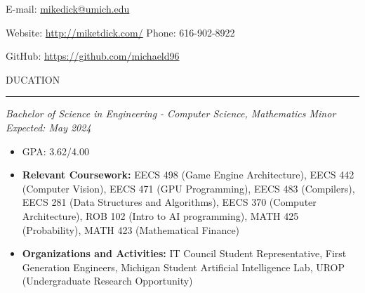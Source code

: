 \documentclass[11pt]{article}
\begin{document}
 \hfill E-mail: {\color{black}\url{ mikedick@umich.edu}}
\par Website: \url{http://miketdick.com/} \hfill Phone: 616-902-8922
\par GitHub: \url{https://github.com/michaeld96}
\newline
\par \scalebox{1.3}{E}DUCATION                    
\par \vspace{-0.1in} \noindent\rule{7.8in}{0.5pt} 
\textbf{\scalebox{1.2}{University of Michigan - Ann Arbor}}
\par \textit{Bachelor of Science in Engineering - Computer Science, Mathematics Minor} \hfill \textit{Expected: May 2024}
{\small 

\begin{itemize}
    \item GPA: 3.62/4.00
    \item \textbf{Relevant Coursework:} EECS 498 (Game Engine Architecture), EECS 442 (Computer Vision), EECS 471 (GPU Programming), EECS 483 (Compilers), EECS 281 (Data Structures and Algorithms), EECS 370 (Computer Architecture), ROB 102 (Intro to AI programming), MATH 425 (Probability), MATH 423 (Mathematical Finance)
    \item \textbf{Organizations and Activities:} IT Council Student Representative, First Generation Engineers, Michigan Student Artificial Intelligence Lab, UROP (Undergraduate Research Opportunity) 
\end{itemize}
}
\end{document}
